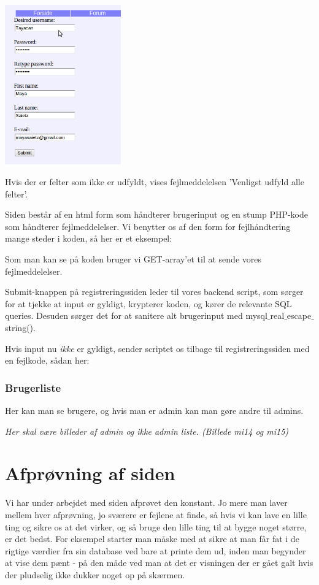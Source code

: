 \documentclass{article}
\begin{document}
\begin{center}
\includegraphics[width=50mm]{mi08.png}
\end{center}

Hvis der er felter som ikke er udfyldt, vises fejlmeddelelsen 'Venligst udfyld alle felter'.

Siden består af en html form som håndterer brugerinput og en stump PHP-kode som håndterer fejlmeddelelser. Vi benytter os af den form for fejlhåndtering mange steder i koden, så her er et eksempel:



Som man kan se på koden bruger vi GET-array'et til at sende vores fejlmeddelelser.

Submit-knappen på registreringssiden leder til vores backend script, som sørger for at tjekke at input er gyldigt, krypterer koden, og kører de relevante SQL queries. Desuden sørger det for at sanitere alt brugerinput med mysql$\_$real$\_$escape$\_$string(). 

Hvis input nu \emph{ikke} er gyldigt, sender scriptet os tilbage til registreringssiden med en fejlkode, sådan her:



\subsubsection{Brugerliste}
Her kan man se brugere, og hvis man er admin kan man gøre andre til admins.

\begin{center}
\emph{Her skal være billeder af admin og ikke admin liste. (Billede mi14 og mi15)}
\end{center}



\section{Afprøvning af siden}
Vi har under arbejdet med siden afprøvet den konstant. Jo mere man laver mellem hver afprøvning, jo sværere er fejlene at finde, så hvis vi kan lave en lille ting og sikre os at det virker, og så bruge den lille ting til at bygge noget større, er det bedst. For eksempel starter man måske med at sikre at man får fat i de rigtige værdier fra sin database ved bare at printe dem ud, inden man begynder at vise dem pænt - på den måde ved man at det er visningen der er gået galt hvis der pludselig ikke dukker noget op på skærmen.
\end{document}
